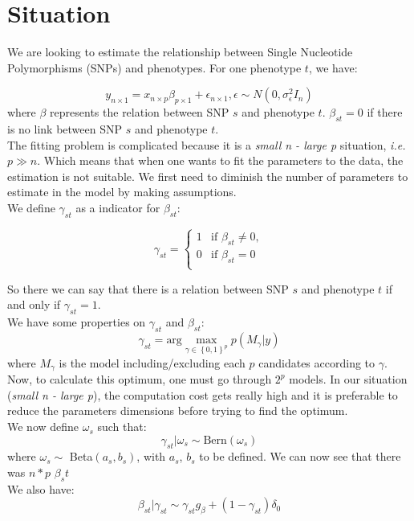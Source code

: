 \section{Situation}
We are looking to estimate the relationship between Single Nucleotide Polymorphisms (SNPs) and phenotypes. For one phenotype $t$, we have:

\begin{equation}
y_{n \times 1} = x_{n\times p} \beta_{p\times 1} + \epsilon_{n \times 1},  \epsilon \sim N \left( 0, \sigma_{\epsilon}^2I_n \right)
\label{eq:model}
\end{equation}
where $\beta$ represents the relation between SNP $s$ and phenotype $t$. $\beta_{st} = 0$ if there is no link between SNP $s$ and phenotype $t$.\\
\newline
The fitting problem is complicated because it is a\textit{ small n - large p }situation, \textit{i.e.} $p \gg n$. Which means that when one wants to fit the parameters to the data, the estimation is not suitable. We first need to diminish the number of parameters to estimate in the model by making assumptions.\\
\newline
We define $\gamma_{st}$ as a indicator for $\beta_{st}$:

\begin{equation}
\gamma_{st} = \left\lbrace \begin{array}{ll}
1 & \text{if } \beta_{st} \neq 0,\\
0 & \text{if } \beta_{st}  = 0\\
\end{array}\right.
\label{eq:gamma}
\end{equation}

So there we can say that there is a relation between SNP $s$ and phenotype $t$ if and only if $\gamma_{st} = 1$.\\
We have some properties on $\gamma_{st}$ and $\beta_{st}$:
\begin{equation}
\gamma_{st} = \text{arg} \max_{\gamma \in \left\lbrace0,1\right\rbrace^p}p(M_\gamma|y)
\end{equation}
where $M_\gamma$ is the model including/excluding each $p$ candidates according to $\gamma$. \\
Now, to calculate this optimum, one must go through $2^p$ models. In our situation (\textit{small n - large p}), the computation cost gets really high and it is preferable to reduce the parameters dimensions before trying to find the optimum.\\
\newline
We now define $\omega_s$ such that:
\begin{equation}
\gamma_{st} | \omega_s \sim \text{Bern}(\omega_s)
\label{eq:omega}
\end{equation}
where $\omega_s\sim $ Beta$(a_s,b_s)$, with $a_s$, $b_s$ to be defined. We can now see that there was $n*p$ $\beta_st$ \\
\newline
We also have:
\begin{equation}
\beta_{st} | \gamma_{st} \sim \gamma_{st} g_{\beta} + (1-\gamma_{st})\delta_0
\label{eq:spikenslab}
\end{equation}

